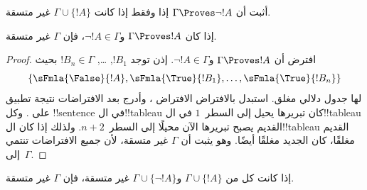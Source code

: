 \documentclass[../../../include/open-logic-section]{subfiles}
\begin{document}
\begin{prob}
أثبت أن $\Gamma \Proves \lnot !A$ إذا وفقط إذا كانت $\Gamma \cup \{!A\}$ غير متسقة.
\end{prob}

\begin{prop}
  إذا كان $\Gamma \Proves !A$ و$\lnot !A \in \Gamma$، فإن $\Gamma$
  غير متسقة.
\end{prop}

\begin{proof}
  افترض أن $\Gamma \Proves !A$ و$\lnot !A \in \Gamma$. إذن توجد
  $!B_1$, \dots, $!B_n \in \Gamma$ بحيث
  \[
  \{\sFmla{\False}{!A}, \sFmla{\True}{!B_1}, \dots, \sFmla{\True}{!B_n}\}
  \]
  لها جدول دلالي مغلق. استبدل بالافتراض  الافتراض
  ، وأدرج بعد الافتراضات نتيجة تطبيق
  \TRule{\True}{\lnot} على . وكل !!{sentence}
  في ال!!{tableau} كان تبريرها يحيل إلى السطر~$1$ في ال!!{tableau}
  القديم يصبح تبريرها الآن
  محيلًا إلى السطر~$n+2$. ولذلك إذا كان ال!!{tableau} القديم مغلقًا، كان
  الجديد مغلقًا أيضًا. وهو يثبت أن $\Gamma$ غير متسقة، لأن جميع الافتراضات
  تنتمي إلى~$\Gamma$.
\end{proof}

\begin{prop}
  إذا كانت كل من $\Gamma \cup \{!A\}$ و$\Gamma \cup \{\lnot !A\}$
  غير متسقة، فإن $\Gamma$ غير متسقة.
\end{prop}
\end{document}
